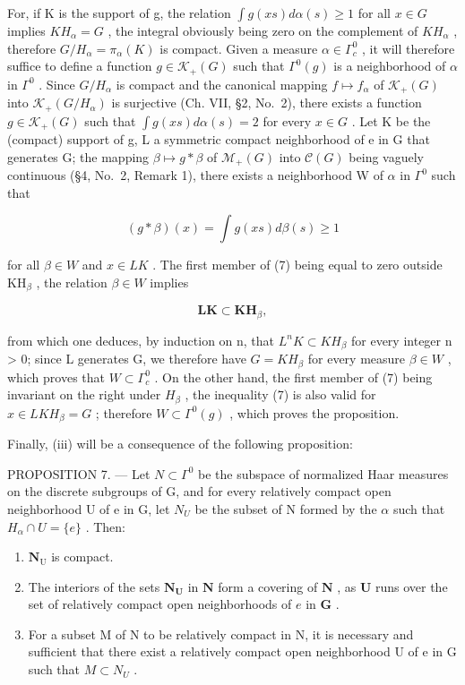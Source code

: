 For, if K is the support of g, the relation \(\int g(xs) d\alpha(s) \geqslant 1\) for all \(x \in G\) implies \(KH_{\alpha} = G\) , the integral obviously being zero on the complement of \(KH_{\alpha}\) , therefore \(G/H_{\alpha} = \pi_{\alpha}(K)\) is compact. Given a measure \(\alpha \in \Gamma_{c}^{0}\) , it will therefore suffice to define a function \(g \in \mathcal{K}_{+}(G)\) such that \(\Gamma^{0}(g)\) is a neighborhood of \(\alpha\) in \(\Gamma^{0}\) . Since \(G/H_{\alpha}\) is compact and the canonical mapping \(f \mapsto f_{\alpha}\) of \(\mathcal{K}_{+}(G)\) into \(\mathcal{K}_{+}(G/H_{\alpha})\) is surjective (Ch. VII, §2, No.~2), there exists a function \(g \in \mathcal{K}_{+}(G)\) such that \(\int g(xs) d\alpha(s) = 2\) for every \(x \in G\) . Let K be the (compact) support of g, L a symmetric compact neighborhood of e in G that generates G; the mapping \(\beta \mapsto g*\beta\) of \(\mathcal{M}_{+}(G)\) into \(\mathcal{C}(G)\) being vaguely continuous (§4, No.~2, Remark 1), there exists a neighborhood W of \(\alpha\) in \(\Gamma^{0}\) such that

\[
(g * \beta) (x) = \int g (x s) d \beta (s) \geqslant 1\tag{7}
\]

for all \(\beta \in W\) and \(x \in LK\) . The first member of (7) being equal to zero outside \(\mathrm{KH}_{\beta}\) , the relation \(\beta \in W\) implies

\[
\mathbf {L K} \subset \mathbf {K H} _ {\beta},
\]

from which one deduces, by induction on n, that \(L^{n}K \subset KH_{\beta}\) for every integer n \textgreater{} 0; since L generates G, we therefore have \(G = KH_{\beta}\) for every measure \(\beta \in W\) , which proves that \(W \subset \Gamma_{c}^{0}\) . On the other hand, the first member of (7) being invariant on the right under \(H_{\beta}\) , the inequality (7) is also valid for \(x \in LKH_{\beta} = G\) ; therefore \(W \subset \Gamma^{0}(g)\) , which proves the proposition.

Finally, (iii) will be a consequence of the following proposition:

PROPOSITION 7. --- Let \(N \subset \Gamma^{0}\) be the subspace of normalized Haar measures on the discrete subgroups of G, and for every relatively compact open neighborhood U of e in G, let \(N_{U}\) be the subset of N formed by the \(\alpha\) such that \(H_{\alpha} \cap U = \{e\}\) . Then:

\begin{enumerate}
\def\labelenumi{\alph{enumi})}
\item
  \(\mathbf{N}_{\mathrm{U}}\) is compact.
\item
  The interiors of the sets \(\mathbf{N}_{\mathbf{U}}\) in \(\mathbf{N}\) form a covering of \(\mathbf{N}\) , as \(\mathbf{U}\) runs over the set of relatively compact open neighborhoods of \(e\) in \(\mathbf{G}\) .
\item
  For a subset M of N to be relatively compact in N, it is necessary and sufficient that there exist a relatively compact open neighborhood U of e in G such that \(M \subset N_{U}\) .
\end{enumerate}

